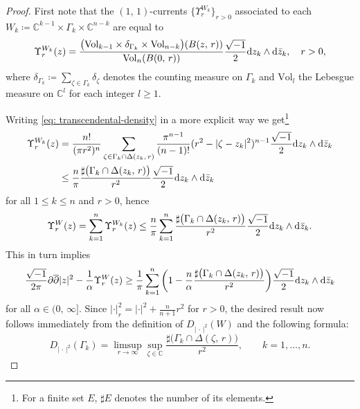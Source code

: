\documentclass[12pt,a4paper]{amsart}
\numberwithin{equation}{section}
\theoremstyle{definition}
\begin{document}
\begin{proof}
First note that  the $(1,\, 1)$-currents $\{\Upsilon^{W_k}_r\}_{r>0}$ associated to each $W_k\coloneqq \mathbb C^{k-1}\times\Gamma_k\times\mathbb C^{n-k}$ are equal to
  \begin{equation}\label{eq: transcendental-density}
    \Upsilon^{W_k}_r(z)=\frac{\big(\mathrm{Vol}_{k-1}\times\delta_{\Gamma_k}\times\mathrm{Vol}_{n-k}\big)(B(z, \,r))}{\mathrm{Vol}_n(B(0, \,r))}
                      \frac{\sqrt{-1}}{2} {\rm d}z_k\wedge{\rm d}\bar{z}_k, \quad  r>0,
  \end{equation}
where $\delta_{\Gamma_k}\coloneqq\sum_{\zeta\in\Gamma_k}\delta_{\zeta}$ denotes the counting measure on $\Gamma_k$  and $\mathrm{Vol}_l$ the Lebesgue measure on $\mathbb C^l$ for each integer $l\geq 1$.

Writing \eqref{eq: transcendental-density} in a more explicit way we get\footnote{For a finite set $E$, $\sharp E$ denotes the number of its elements.}
  \begin{equation*}
  \begin{split}
    \Upsilon^{W_k}_r(z)
      &=\frac{n!}{(\pi r^2)^n}\sum_{\zeta\in\Gamma_k\cap\Delta(z_k,\, r)}\frac{\pi^{n-1}}{(n-1)!}(r^2-|\zeta-z_k|^2)^{n-1}
                         \frac{\sqrt{-1}}{2} {\rm d}z_k\wedge{\rm d}\bar{z}_k \\
      &\leq\frac{n}{\pi}\frac{\sharp\big(\Gamma_k\cap\Delta(z_k,\, r)\big)}{r^2}\frac{\sqrt{-1}}{2} {\rm d}z_k\wedge{\rm d}\bar{z}_k
  \end{split}
  \end{equation*}
for all $1\leq k\leq n$ and $r>0$, hence
  $$
  \Upsilon^{W}_r(z)=\sum_{k=1}^{n}\Upsilon^{W_k}_r(z)
  \leq \frac{n}{\pi} \sum_{k=1}^{n}\frac{\sharp\big(\Gamma_k\cap\Delta(z_k,\, r)\big)}{r^2}\frac{\sqrt{-1}}{2} {\rm d}z_k\wedge{\rm d}\bar{z}_k.
  $$
This in turn implies
  $$
  \frac{\sqrt{-1}}{2\pi}\partial\overline{\partial}|z|^2-\frac{1}{\alpha} \Upsilon^W_r(z)
  \geq \frac{1}{\pi} \sum_{k=1}^{n}\bigg(1-\frac{n}{\alpha}\frac{\sharp\big(\Gamma_k\cap\Delta(z_k,\, r)\big)}{r^2}\bigg)\frac{\sqrt{-1}}{2} {\rm d}z_k\wedge{\rm d}\bar{z}_k
  $$
for all $\alpha\in (0,\, \infty]$. Since $|\cdot|^2_r=|\cdot|^2+\frac{n}{n+1}r^2$ for $r>0$, the desired result now follows immediately from the definition of $D_{|\,\cdot\,|^2}(W)$ and the following formula:
  $$
  D_{|\,\cdot\,|^2}(\Gamma_k)=\limsup\limits_{r\to \infty}\sup_{\zeta\in\mathbb C}\frac{\sharp\big(\Gamma_k\cap\Delta(\zeta,\, r)\big)}{r^2}, \qquad k=1,\ldots,n.
  $$
\end{proof}
\end{document}
